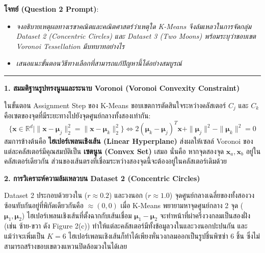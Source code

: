\documentclass[12pt,a4paper]{article}
\begin{document}
\begin{ansbox}[unbreakable, fontupper={\fontsize{9.6pt}{12.6pt}\selectfont}, left=6pt, right=6pt, top=3pt, bottom=3pt]
\textbf{โจทย์ (Question 2 Prompt)}:
\begin{itemize}[leftmargin=1.2em, itemsep=0pt, topsep=0pt, parsep=0pt]
    \item[(a)] \textit{จงอธิบายเหตุผลทางเรขาคณิตและคณิตศาสตร์ว่าเหตุใด K-Means จึงล้มเหลวในการจัดกลุ่ม Dataset 2 (Concentric Circles) และ Dataset 3 (Two Moons) พร้อมระบุว่าขอบเขต Voronoi Tessellation มีบทบาทอย่างไร}
    \item[(b)] \textit{เสนอแนะขั้นตอนวิธีทางเลือกที่สามารถแก้ปัญหานี้ได้อย่างสมบูรณ์}
\end{itemize}

\vspace{-0.2em}
\noindent\rule{\linewidth}{0.4pt}
\vspace{-0.2em}

\noindent\textbf{\normalsize 1. สมมติฐานรูปทรงนูนและระนาบ Voronoi (Voronoi Convexity Constraint)}\par\vspace{0.05em}
ในขั้นตอน Assignment Step ของ K-Means ขอบเขตการตัดสินใจระหว่างคลัสเตอร์ $C_j$ และ $C_k$ คือเซตของจุดที่มีระยะทางไปยังจุดศูนย์กลางทั้งสองเท่ากัน:
\begin{equation*}
    \{\mathbf{x} \in \mathbb{R}^d \mid \|\mathbf{x} - \boldsymbol{\mu}_j\|_2^2 = \|\mathbf{x} - \boldsymbol{\mu}_k\|_2^2\} \iff 2(\boldsymbol{\mu}_k - \boldsymbol{\mu}_j)^T\mathbf{x} + \|\boldsymbol{\mu}_j\|^2 - \|\boldsymbol{\mu}_k\|^2 = 0
\end{equation*}
สมการข้างต้นคือ \textbf{ไฮเปอร์เพลนเชิงเส้น (Linear Hyperplane)} ส่งผลให้เซลล์ Voronoi ของแต่ละคลัสเตอร์มีคุณสมบัติเป็น \textbf{เซตนูน (Convex Set)} เสมอ นั่นคือ หากจุดสองจุด $\mathbf{x}_a, \mathbf{x}_b$ อยู่ในคลัสเตอร์เดียวกัน ส่วนของเส้นตรงที่เชื่อมระหว่างสองจุดนี้จะต้องอยู่ในคลัสเตอร์เดิมด้วย

\vspace{0.15em}
\noindent\textbf{\normalsize 2. การวิเคราะห์ความล้มเหลวบน Dataset 2 (Concentric Circles)}\par\vspace{0.05em}
Dataset 2 ประกอบด้วยวงใน ($r \approx 0.2$) และวงนอก ($r \approx 1.0$) จุดศูนย์กลางเฉลี่ยของทั้งสองวงซ้อนทับกันอยู่ที่พิกัดเดียวกันคือ $\approx (0, 0)$ เมื่อ K-Means พยายามหาจุดศูนย์กลาง 2 จุด ($\boldsymbol{\mu}_1, \boldsymbol{\mu}_2$) ไฮเปอร์เพลนเชิงเส้นที่ตั้งฉากกับเส้นเชื่อม $\boldsymbol{\mu}_1 - \boldsymbol{\mu}_2$ จะทำหน้าที่ผ่าครึ่งวงกลมเป็นสองฝั่ง (เช่น ซ้าย-ขวา ดัง Figure 2(c)) ทำให้แต่ละคลัสเตอร์มีทั้งข้อมูลวงในและวงนอกปะปนกัน และแม้ว่าจะเพิ่มเป็น $K=6$ ไฮเปอร์เพลนเชิงเส้นก็ทำได้เพียงหั่นวงกลมออกเป็นรูปชิ้นพิซซ่า 6 ชิ้น ซึ่งไม่สามารถสร้างขอบเขตวงแหวนปิดล้อมวงในได้เลย


\end{ansbox}
\end{document}
